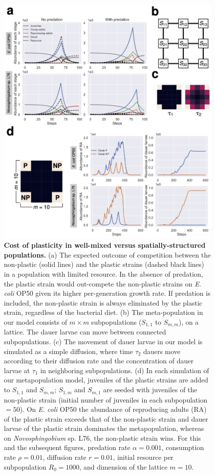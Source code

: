 \documentclass[10pt,letterpaper]{article}
\newcommand{\ecoli}{\emph{E. coli} OP50}
\newcommand{\novo}{\emph{Novosphingobium} sp. L76}
\begin{document}
\begin{figure}
\begin{adjustwidth}{-2in}{0in}
    \begin{flushright}
\includegraphics[width=140mm]{figures/figure2.jpg}
\caption{\textbf{Cost of plasticity in well-mixed versus spatially-structured populations.} \footnotesize (a) The expected outcome of competition between the non-plastic (solid lines) and the plastic strains (dashed black lines) in a population with limited resource. In the absence of predation, the plastic strain would out-compete the non-plastic strains on \ecoli{} given its higher per-generation growth rate. If predation is included, the non-plastic strain is always eliminated by the plastic strain, regardless of the bacterial diet. (b) The meta-population in our model consists of $m \times m$ subpopulations ($S_{1,1}$ to $S_{m, m}$), on a lattice. The dauer larvae can move between connected subpopulations. (c) The movement of dauer larvae in our model is simulated as a simple diffusion, where time $\tau_2$ dauers move according to their diffusion rate and the concentration of dauer larvae at $\tau_1$ in neighboring subpopulations. (d) In each simulation of our metapopulation model, juveniles of the plastic strains are added to $S_{1,1}$ and $S_{m,m}$;  $S_{1,m}$ and $S_{m,1}$ are seeded with juveniles of the non-plastic strain (initial number of juveniles in each subpopulation $=50$). On \ecoli{} the abundance of reproducing adults (RA) of the plastic strain exceeds that of the non-plastic strain and dauer larvae of the plastic strain dominates the metapopulation, whereas on \novo{}, the non-plastic strain wins. For this and the subsequent figures, predation rate $\alpha=0.001$, consumption rate $\rho=0.01$, diffusion rate $r=0.01$, initial resource per subpopulation $R_0 = 1000$, and dimension of the lattice $m=10$.}

\end{flushright}
\end{adjustwidth}
\end{figure}
\end{document}

